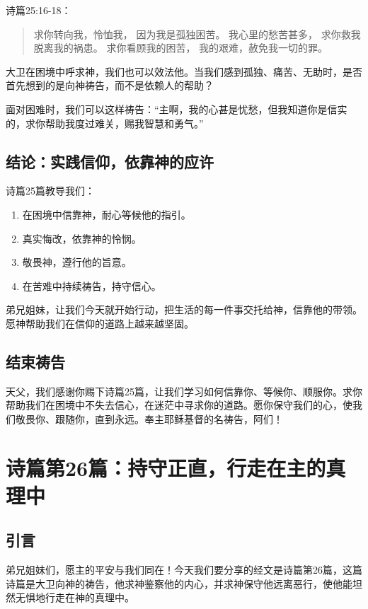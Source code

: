 \documentclass[a4paper, 12pt]{article}
\begin{document}
诗篇25:16-18：
\begin{quote}
求你转向我，怜恤我，
因为我是孤独困苦。
我心里的愁苦甚多，
求你救我脱离我的祸患。
求你看顾我的困苦，
我的艰难，赦免我一切的罪。
\end{quote}

大卫在困境中呼求神，我们也可以效法他。当我们感到孤独、痛苦、无助时，是否首先想到的是向神祷告，而不是依赖人的帮助？

面对困难时，我们可以这样祷告：“主啊，我的心甚是忧愁，但我知道你是信实的，求你帮助我度过难关，赐我智慧和勇气。”

\subsection*{结论：实践信仰，依靠神的应许}

\hspace{0.6cm}诗篇25篇教导我们：
\begin{enumerate}
    \item 在困境中信靠神，耐心等候他的指引。
    \item 真实悔改，依靠神的怜悯。
    \item 敬畏神，遵行他的旨意。
    \item 在苦难中持续祷告，持守信心。
\end{enumerate}


弟兄姐妹，让我们今天就开始行动，把生活的每一件事交托给神，信靠他的带领。愿神帮助我们在信仰的道路上越来越坚固。

\subsection*{结束祷告}

天父，我们感谢你赐下诗篇25篇，让我们学习如何信靠你、等候你、顺服你。求你帮助我们在困境中不失去信心，在迷茫中寻求你的道路。愿你保守我们的心，使我们敬畏你、跟随你，直到永远。奉主耶稣基督的名祷告，阿们！
\newpage
\section{诗篇第26篇：持守正直，行走在主的真理中}


\subsection*{引言}

\hspace{0.6cm}弟兄姐妹们，愿主的平安与我们同在！今天我们要分享的经文是诗篇第26篇，这篇诗篇是大卫向神的祷告，他求神鉴察他的内心，并求神保守他远离恶行，使他能坦然无惧地行走在神的真理中。
\end{document}
